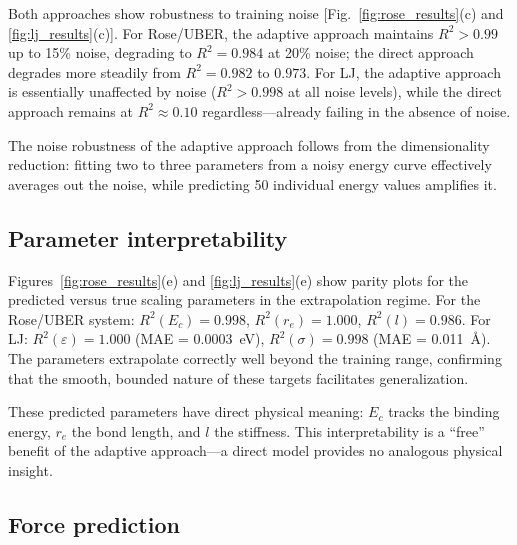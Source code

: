 \documentclass[aps,prb,twocolumn,superscriptaddress,longbibliography,floatfix]{revtex4-2}
\begin{document}
Both approaches show robustness to training noise [Fig.~\ref{fig:rose_results}(c) and \ref{fig:lj_results}(c)]. For Rose/UBER, the adaptive approach maintains $R^2 > 0.99$ up to 15\% noise, degrading to $R^2 = 0.984$ at 20\% noise; the direct approach degrades more steadily from $R^2 = 0.982$ to $0.973$. For LJ, the adaptive approach is essentially unaffected by noise ($R^2 > 0.998$ at all noise levels), while the direct approach remains at $R^2 \approx 0.10$ regardless---already failing in the absence of noise.

The noise robustness of the adaptive approach follows from the dimensionality reduction: fitting two to three parameters from a noisy energy curve effectively averages out the noise, while predicting 50 individual energy values amplifies it.

\subsection{Parameter interpretability}
\label{sec:params}

Figures~\ref{fig:rose_results}(e) and \ref{fig:lj_results}(e) show parity plots for the predicted versus true scaling parameters in the extrapolation regime. For the Rose/UBER system: $R^2(E_c) = 0.998$, $R^2(r_e) = 1.000$, $R^2(l) = 0.986$. For LJ: $R^2(\varepsilon) = 1.000$ (MAE = 0.0003~eV), $R^2(\sigma) = 0.998$ (MAE = 0.011~\AA). The parameters extrapolate correctly well beyond the training range, confirming that the smooth, bounded nature of these targets facilitates generalization.

These predicted parameters have direct physical meaning: $E_c$ tracks the binding energy, $r_e$ the bond length, and $l$ the stiffness. This interpretability is a ``free'' benefit of the adaptive approach---a direct model provides no analogous physical insight.

\subsection{Force prediction}
\label{sec:forces}
\end{document}
